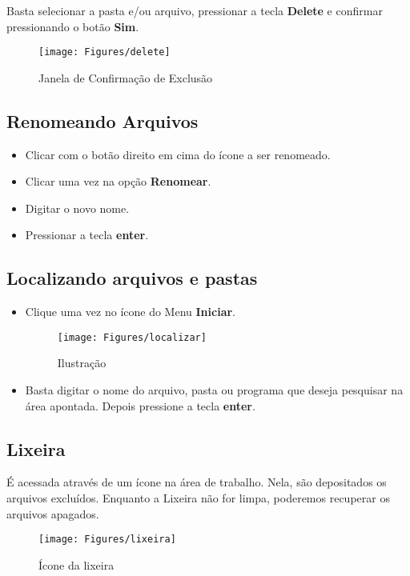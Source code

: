 \documentclass[hidelinks,12pt]{article}
\begin{document}
Basta selecionar a pasta e/ou arquivo, pressionar a tecla {\bf Delete} e confirmar pressionando o botão {\bf Sim}.

	\begin{figure}[!h]
		\centering
		\texttt{[image: Figures/delete]}
		\caption{Janela de Confirmação de Exclusão}
		\label{fig:delete}
	\end{figure}

\subsection{Renomeando Arquivos}

\begin{itemize}
	\item Clicar com o botão direito em cima do ícone a ser renomeado.
	\item Clicar uma vez na opção {\bf Renomear}.
	\item Digitar o novo nome.
	\item Pressionar a tecla {\bf enter}.
\end{itemize}

\subsection{Localizando arquivos e pastas}

\begin{itemize}
	\item Clique uma vez no ícone do Menu {\bf Iniciar}.

	\begin{figure}[!h]
		\centering
		\texttt{[image: Figures/localizar]}
		\caption{Ilustração}
		\label{fig:localizar}
	\end{figure}

	\item  Basta digitar o nome do arquivo, pasta ou programa que deseja pesquisar na área apontada. Depois pressione a tecla {\bf enter}.
\end{itemize}

\subsection{Lixeira}

É acessada através de um ícone na área de trabalho. Nela, são depositados os arquivos excluídos. Enquanto a Lixeira não for limpa, poderemos recuperar os arquivos apagados.

\begin{figure}[!h]
	\centering
	\texttt{[image: Figures/lixeira]}
	\caption{Ícone da lixeira}
	\label{fig:lixeira}
\end{figure}
\end{document}
